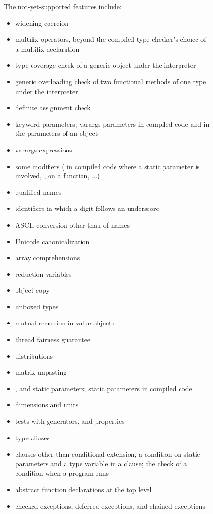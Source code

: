 \begin{figure}[p]
The not-yet-supported features include:
\begin{itemize}
\item widening coercion
\item multifix operators, beyond the compiled type checker's choice of a
multifix declaration
\item type coverage check of a generic object under the interpreter
\item generic overloading check of two functional methods of one type under
the interpreter
\item definite assignment check
\item keyword parameters; varargs parameters in compiled code and in the
parameters of an object
\item varargs expressions
\item some modifiers ( in compiled code where a static
parameter is involved, ,  on a function, ...)
\item qualified names
\item identifiers in which a digit follows an underscore
\item ASCII conversion other than of names
\item Unicode canonicalization
\item array comprehensions
\item reduction variables
\item object copy
\item unboxed types
\item mutual recursion in value objects
\item thread fairness guarantee
\item distributions
\item matrix unpasting
\item {},  and  static parameters;  static
parameters in compiled code
\item dimensions and units
\item tests with generators, and properties
\item type aliases
\item {} clauses other than conditional extension, a condition on
static parameters and a type variable in a  clause; the check
of a condition when a program runs
\item abstract function declarations at the top level
\item checked exceptions, deferred exceptions, and chained exceptions

\end{itemize}
\end{figure}
